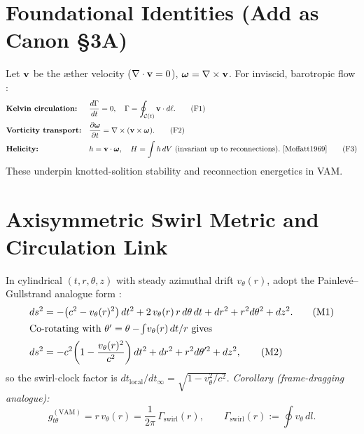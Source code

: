 \documentclass[11pt]{article}
\begin{document}
\section{Foundational Identities (Add as Canon \S3A)}
\label{sec:foundational-identities}
Let \(\vb v\) be the æther velocity (\(\nabla\cdot \vb v=0\)), \(\bm{\omega}=\nabla\times \vb v\). For inviscid, barotropic flow \cite{Helmholtz1858,Kelvin1869,Batchelor1967,LandauLifshitz1987}:
\begin{align}
  &\textbf{Kelvin circulation:} && \frac{d\Gamma}{dt}=0,\quad \Gamma=\oint_{\mathcal{C}(t)} \vb v\cdot d\vb \ell. \tag{F1} \label{eq:kelvin} \\
  &\textbf{Vorticity transport:} && \pdv{\bm{\omega}}{t} = \nabla\times(\vb v\times \bm{\omega}). \tag{F2} \label{eq:vorticity-transport}\\
  &\textbf{Helicity:} && h=\vb v\cdot \bm{\omega},\quad H=\int h\, dV\ \text{(invariant up to reconnections)}.~\cite{Moffatt1969} \tag{F3}\label{eq:helicity}
\end{align}
These underpin knotted-solition stability and reconnection energetics in VAM.

\section{Axisymmetric Swirl Metric and Circulation Link}
\label{sec:metric}
In cylindrical \((t,r,\theta,z)\) with steady azimuthal drift \(v_\theta(r)\), adopt the Painlevé–Gullstrand analogue form \cite{Unruh1981,Visser1998,Painleve1921,Gullstrand1922}:
\begin{align}
  ds^2 &= -\big(c^2 - v_\theta(r)^2\big)\,dt^2 + 2\,v_\theta(r)\,r\, d\theta\, dt + dr^2 + r^2 d\theta^2 + dz^2. \tag{M1}\label{eq:pg} \\
  \intertext{Co-rotating with \(\theta'=\theta-\!\int \! v_\theta(r)\,dt/r\) gives}
  ds^2 &= -c^2\!\left(1-\frac{v_\theta(r)^2}{c^2}\right)dt^2 + dr^2 + r^2 d\theta'^2 + dz^2, \tag{M2}
\end{align}
so the swirl-clock factor is \(dt_{\text{local}}/dt_\infty=\sqrt{1-v_\theta^2/c^2}\). \emph{Corollary (frame-dragging analogue):}
\begin{equation}
  g^{(\mathrm{VAM})}_{t\theta} = r\,v_\theta(r) = \frac{1}{2\pi}\,\Gamma_{\text{swirl}}(r),\qquad \Gamma_{\text{swirl}}(r):=\oint v_\theta\, dl. \tag{M3}\label{eq:gtth}
\end{equation}
\end{document}
